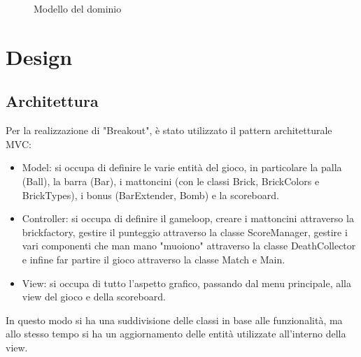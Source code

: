 \documentclass[a4paper,12pt]{report}
\begin{document}
\begin{figure}[htbp]
    \caption{Modello del dominio}
    \label{fig:label}
\end{figure}


\chapter{Design}

\section{Architettura}
Per la realizzazione di "Breakout", è stato utilizzato il pattern architetturale MVC:
\begin{itemize}
    \item Model: si occupa di definire le varie entità del gioco, in particolare la palla (Ball), la barra (Bar), i mattoncini (con le classi Brick, BrickColors e BrickTypes), i bonus (BarExtender, Bomb) e la scoreboard.
    \item Controller: si occupa di definire il gameloop, creare i mattoncini attraverso la brickfactory, gestire il punteggio attraverso la classe ScoreManager, gestire i vari componenti che man mano "muoiono" attraverso la classe DeathCollector  e infine far partire il gioco attraverso la classe Match e Main.
    \item View: si occupa di tutto l'aspetto grafico, passando dal menu principale, alla view del gioco e della scoreboard.
\end{itemize}
In questo modo si ha una suddivisione delle classi in base alle funzionalità, ma allo stesso tempo si ha un aggiornamento delle entità utilizzate all'interno della view.
\end{document}

